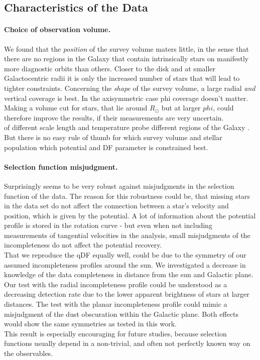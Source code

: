\subsection{Characteristics of the Data}


\paragraph{Choice of observation volume.} We found that the \emph{position} of the survey volume maters little, in the sense that there are no regions in the Galaxy that contain intrinsically stars on manifestly more diagnostic orbits than others. Closer to the disk and at smaller Galactocentric radii it is only the increased number of stars that will lead to tighter constraints. Concerning the \emph{shape} of the survey volume, a large radial \emph{and} vertical coverage is best. In the axisymmetric case phi coverage doesn't matter. Making a volume cut for stars, that lie around $R_\odot$ but at larger $phi$, could therefore improve the results, if their measurements are very uncertain.
\\\MAPs of different scale length and temperature probe different regions of the Galaxy \citep{bov13}. But there is no easy rule of thumb for which survey volume and stellar population which potential and DF parameter is constrained best.

\paragraph{Selection function misjudgment.} Surprisingly \RM seems to be very robust against misjudgments in the selection function of the data. The reason for this robustness could be, that missing stars in the data set do not affect the connection between a star's velocity and position, which is given by the potential. A lot of information about the potential profile is stored in the rotation curve - but even when not including measurements of tangential velocities in the analysis, small misjudgments of the incompleteness do not affect the potential recovery. 
\\That we reproduce the qDF equally well, could be due to the symmetry of our assumed incompleteness profiles around the sun. We investigated a decrease in knowledge of the data completeness in distance from the sun and Galactic plane. Our test with the radial incompleteness profile could be understood as a decreasing detection rate due to the lower apparent brightness of stars at larger distances. The test with the planar incompleteness profile could mimic a misjudgment of the dust obscuration within the Galactic plane. Both effects would show the same symmetries as tested in this work. 
\\This result is especially encouraging for future studies, because selection functions usually depend in a non-trivial, and often not perfectly known way on the observables.

